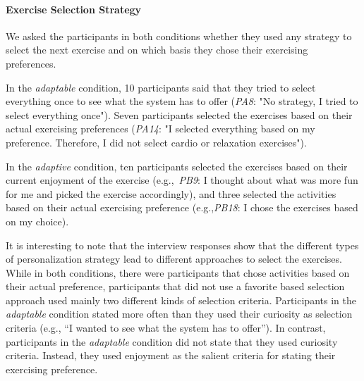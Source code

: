 \documentclass[twocolumn]{svjour3}          %
\begin{document}


\paragraph{Exercise Selection Strategy}
We asked the participants in both conditions whether they used any strategy to select the next exercise and on which basis they chose their exercising preferences.

In the \textit{adaptable} condition, 10 participants said that they tried to select everything once to see what the system has to offer (\textit{PA8}: "No strategy, I tried to select everything once"). Seven participants selected the exercises based on their actual exercising preferences (\textit{PA14}: "I selected everything based on my preference. Therefore, I did not select cardio or relaxation exercises").

In the \textit{adaptive} condition, ten participants selected the exercises based on their current enjoyment of the exercise (e.g.,~\textit{PB9}: I thought about what was more fun for me and picked the exercise accordingly), and three selected the activities based on their actual exercising preference (e.g.,\textit{PB18}: I chose the exercises based on my choice).

It is interesting to note that the interview responses show that the different types of personalization strategy lead to different approaches to select the exercises. While in both conditions, there were participants that chose activities based on their actual preference, participants that did not use a favorite based selection approach used mainly two different kinds of selection criteria. Participants in the \textit{adaptable} condition stated more often than they used their curiosity as selection criteria (e.g., ``I wanted to see what the system has to offer''). In contrast, participants in the \textit{adaptable} condition did not state that they used curiosity criteria. Instead, they used enjoyment as the salient criteria for stating their exercising preference.
\end{document}

